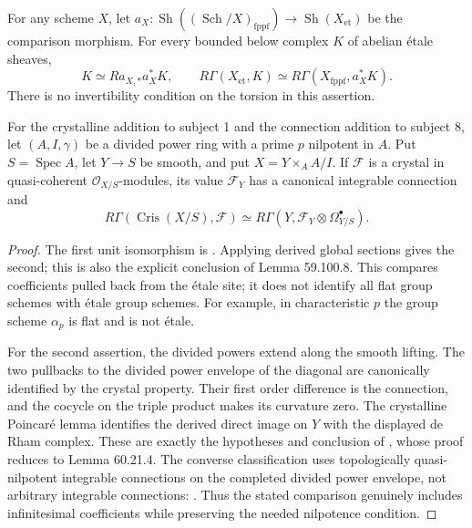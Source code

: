 \begin{theorem}\label{thm:B3-flat-crys}
For any scheme $X$, let
$a_X:\operatorname{Sh}((\operatorname{Sch}/X)_{\mathrm{fppf}})
\to\operatorname{Sh}(X_{\mathrm{et}})$ be the comparison morphism.
For every bounded below complex $K$ of abelian \'etale sheaves,
\[
 K\simeq Ra_{X,*}a_X^*K,
 \qquad
 R\Gamma(X_{\mathrm{et}},K)
 \simeq R\Gamma(X_{\mathrm{fppf}},a_X^*K).
\]
There is no invertibility condition on the torsion in this assertion.

For the crystalline addition to subject 1 and the connection addition
to subject 8, let $(A,I,\gamma)$ be a divided power ring with a prime
$p$ nilpotent in $A$. Put $S=\operatorname{Spec}A$, let $Y\to S$
be smooth, and put $X=Y\times_A A/I$. If $\mathcal F$ is a crystal
in quasi-coherent $\mathcal O_{X/S}$-modules, its value $\mathcal F_Y$
has a canonical integrable connection and
\[
 R\Gamma(\operatorname{Cris}(X/S),\mathcal F)
 \simeq R\Gamma(Y,\mathcal F_Y\otimes\Omega^\bullet_{Y/S}).
\]
\end{theorem}
\begin{proof}
The first unit isomorphism is
\cite[Lemma 59.100.7, in tag 0DDK]{BStacks}. Applying derived global
sections gives the second; this is also the explicit conclusion of
Lemma 59.100.8. This compares coefficients pulled back from the
\'etale site; it does not identify all flat group schemes with
\'etale group schemes. For example, in characteristic $p$ the group
scheme $\alpha_p$ is flat and is not \'etale.

For the second assertion, the divided powers extend along the smooth
lifting. The two pullbacks to the divided power envelope of the
diagonal are canonically identified by the crystal property.
Their first order difference is the connection, and the cocycle on
the triple product makes its curvature zero. The crystalline
Poincar\'e lemma identifies the derived direct image on $Y$ with the
displayed de Rham complex. These are exactly the hypotheses and
conclusion of \cite[Remark 60.24.11, tag 07MW]{BStacks}, whose proof
reduces to Lemma 60.21.4. The converse classification uses
topologically quasi-nilpotent integrable connections on the completed
divided power envelope, not arbitrary integrable connections:
\cite[Proposition 60.17.4, tag 07JH, with conditions 07JB--07JE]{BStacks}.
Thus the stated comparison genuinely includes infinitesimal
coefficients while preserving the needed nilpotence condition.
\end{proof}

